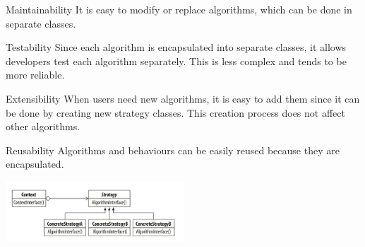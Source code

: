 \begin{nfps}
\item[Maintainability] It is easy to modify or replace algorithms, which can be
    done in separate classes.
\item[Testability] Since each algorithm is encapsulated into separate classes,
    it allows developers test each algorithm separately. This is less complex
    and tends to be more reliable.
\item[Extensibility] When users need new algorithms, it is easy to add them
    since it can be done by creating new strategy classes. This creation
    process does not affect other algorithms.
\item[Reusability] Algorithms and behaviours can be easily reused because they
    are encapsulated.
\end{nfps}

\includegraphics[width=0.5\textwidth]{./strategy}
